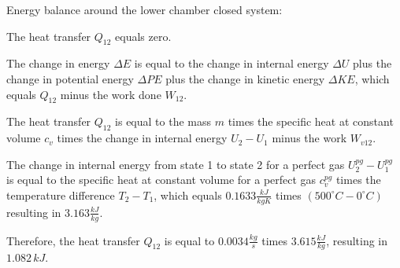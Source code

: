 Energy balance around the lower chamber closed system:

The heat transfer \( Q_{12} \) equals zero.

The change in energy \( \Delta E \) is equal to the change in internal energy \( \Delta U \) plus the change in potential energy \( \Delta PE \) plus the change in kinetic energy \( \Delta KE \), which equals \( Q_{12} \) minus the work done \( W_{12} \).

The heat transfer \( Q_{12} \) is equal to the mass \( m \) times the specific heat at constant volume \( c_v \) times the change in internal energy \( U_2 - U_1 \) minus the work \( W_{v12} \).

The change in internal energy from state 1 to state 2 for a perfect gas \( U_2^{pg} - U_1^{pg} \) is equal to the specific heat at constant volume for a perfect gas \( c_v^{pg} \) times the temperature difference \( T_2 - T_1 \), which equals \( 0.1633 \frac{kJ}{kgK} \) times \( (500^\circ C - 0^\circ C) \) resulting in \( 3.163 \frac{kJ}{kg} \).

Therefore, the heat transfer \( Q_{12} \) is equal to \( 0.0034 \frac{kg}{s} \) times \( 3.615 \frac{kJ}{kg} \), resulting in \( 1.082 \, kJ \).